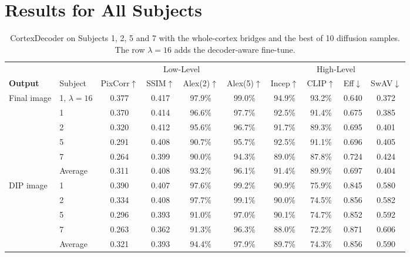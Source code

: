\documentclass[letterpaper]{article} %
\begin{document}
\begin{table}[tp]
\section{Results for All Subjects}
\label{app:subjects}
\vspace{1em}
\centering
\small
\setlength{\tabcolsep}{3pt}
\begin{tabular*}{\textwidth}{@{\extracolsep{\fill}}p{5.2cm}p{1.3cm}cccccccc@{}}
\toprule
& & \multicolumn{4}{c}{Low-Level} & \multicolumn{4}{c}{High-Level} \\
\cmidrule(lr){3-6}\cmidrule(lr){7-10}
\textbf{Output} & Subject
& PixCorr$\uparrow$ & SSIM$\uparrow$ & Alex(2)$\uparrow$ & Alex(5)$\uparrow$
& Incep$\uparrow$ & CLIP$\uparrow$ & Eff$\downarrow$ & SwAV$\downarrow$ \\
\midrule
\multirow{6}{*}{Final image} & 1, $\lambda = 16$ & 0.377 & 0.417 & 97.9\% & 99.0\% & 94.9\% & 93.2\% & 0.640 & 0.372 \\
\cmidrule(l){2-10}
& 1 & 0.370 & 0.414 & 96.6\% & 97.7\% & 92.5\% & 91.4\% & 0.675 & 0.385 \\
& 2 & 0.320 & 0.412 & 95.6\% & 96.7\% & 91.7\% & 89.3\% & 0.695 & 0.401 \\
& 5 & 0.291 & 0.408 & 90.7\% & 95.7\% & 92.5\% & 91.1\% & 0.696 & 0.405 \\
& 7 & 0.264 & 0.399 & 90.0\% & 94.3\% & 89.0\% & 87.8\% & 0.724 & 0.424 \\
\cmidrule(l){2-10}
& Average & 0.311 & 0.408 & 93.2\% & 96.1\% & 91.4\% & 89.9\% & 0.697 & 0.404 \\
\midrule
\multirow{5}{*}{DIP image} & 1 & 0.390 & 0.407 & 97.6\% & 99.2\% & 90.9\% & 75.9\% & 0.845 & 0.580 \\
& 2 & 0.334 & 0.408 & 97.7\% & 99.1\% & 90.0\% & 74.5\% & 0.856 & 0.582 \\
& 5 & 0.296 & 0.393 & 91.0\% & 97.0\% & 90.1\% & 74.7\% & 0.852 & 0.592 \\
& 7 & 0.263 & 0.362 & 91.3\% & 96.3\% & 88.0\% & 72.2\% & 0.871 & 0.606 \\
\cmidrule(l){2-10}
& Average & 0.321 & 0.393 & 94.4\% & 97.9\% & 89.7\% & 74.3\% & 0.856 & 0.590 \\
\bottomrule
\end{tabular*}
\caption{CortexDecoder on Subjects 1, 2, 5 and 7 with the whole-cortex bridges and the best of 10 diffusion samples. The row $\lambda = 16$ adds the decoder-aware fine-tune.}
\label{tab:reconstruction_subjects_final}


\end{table}
\end{document}
